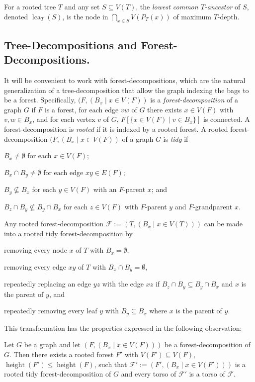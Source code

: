 \documentclass[twoside,leqno]{article}
\renewcommand{\le}{\leqslant}
\newcommand{\defin}[1]{\emph{\textcolor{brightmaroon}{#1}}}
\DeclareMathOperator{\height}{height}
\DeclareMathOperator{\lca}{lca}
\begin{document}
For a rooted tree $T$ and any set $S\subseteq V(T)$, the \defin{lowest common $T$-ancestor} of $S$, denoted \defin{$\lca_T(S)$}, is the node in $\bigcap_{x\in S} V(P_T(x))$ of maximum $T$-depth.

\subsection{Tree-Decompositions and Forest-Decompositions.}

It will be convenient to work with forest-decompositions, which are the natural generalization of a tree-decomposition that allow the graph indexing the bags to be a forest.  Specifically, $(F,(B_x\mid x\in V(F))$ is a \defin{forest-decomposition} of a graph $G$ if $F$ is a forest, for each edge $vw$ of $G$ there exists $x\in V(F)$ with $v,w\in B_x$, and for each vertex $v$ of $G$, $F[\{x\in V(F)\mid v\in B_x\}]$ is connected.  A forest-decomposition is \defin{rooted} if it is indexed by a rooted forest.  A rooted forest-decomposition $(F,(B_x\mid x\in V(F))$ of a graph $G$ is \defin{tidy} if
\begin{enumerate*}[label=(\arabic*)]
  \item $B_x\neq\emptyset$ for each $x\in V(F)$;
  \item $B_x\cap B_y\neq\emptyset$ for each edge $xy\in E(F)$;
  \item $B_y\not\subseteq B_x$ for each $y\in V(F)$ with an $F$-parent $x$; and
  \item $B_z \cap B_y \not\subseteq B_y\cap B_x$ for each $z\in V(F)$ with $F$-parent $y$ and $F$-grandparent $x$.
\end{enumerate*}
Any rooted forest-decomposition $\mathcal{F}:=(T,(B_x\mid x\in V(T)))$ can be made into a rooted tidy forest-decomposition by
\begin{enumerate*}[label=(\arabic*)]
  \item removing every node $x$ of $T$ with $B_x=\emptyset$,
  \item removing every edge $xy$ of $T$ with $B_x\cap B_y=\emptyset$,
  \item repeatedly replacing an edge $yz$ with the edge $xz$ if $B_z\cap B_y\subseteq B_y\cap B_x$ and $x$ is the parent of $y$, and
  \item repeatedly removing every leaf $y$ with $B_y\subseteq B_x$ where $x$ is the parent of $y$.
\end{enumerate*} This transformation has the properties expressed in the following observation:
\begin{obs}\label{tidy_forest}
  Let $G$ be a graph and let $(F,(B_x\mid x\in V(F)))$ be a forest-decomposition of $G$. Then there exists a rooted forest $F'$ with $V(F')\subseteq V(F)$, $\height(F')\le\height(F)$, such that $\mathcal{F}':=(F',(B_x\mid x\in V(F')))$ is a rooted tidy forest-decomposition of $G$ and every torso of $\mathcal{F}'$ is a torso of $\mathcal{F}$.
\end{obs}
\end{document}
